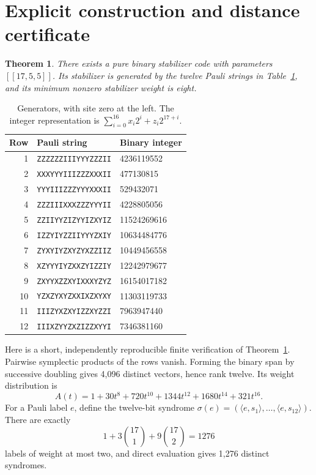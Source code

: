 \documentclass[11pt]{article}
\newtheorem{theorem}{Theorem}
\begin{document}
\section{Explicit construction and distance certificate}
\begin{theorem}\label{thm:code}
There exists a pure binary stabilizer code with parameters $[[17,5,5]]$. Its stabilizer is generated by the twelve Pauli strings in Table~\ref{tab:rows}, and its minimum nonzero stabilizer weight is eight.
\end{theorem}
\begin{table}[ht]
\centering
\begin{tabular}{rll}
\toprule
Row & Pauli string & Binary integer \\
\midrule
1 & \texttt{ZZZZZZIIIYYYZZZII} & 4236119552\\
2 & \texttt{XXXYYYIIIZZZXXXII} & 477130815\\
3 & \texttt{YYYIIIZZZYYYXXXII} & 529432071\\
4 & \texttt{ZZZIIIXXXZZZYYYII} & 4228805056\\
5 & \texttt{ZZIIYYZIZYYIZXYIZ} & 11524269616\\
6 & \texttt{IZZYIYZZIIYYYZXIY} & 10634484776\\
7 & \texttt{ZYXYIYZXYZYXZZIIZ} & 10449456558\\
8 & \texttt{XZYYYIYZXXZYIZZIY} & 12242979677\\
9 & \texttt{ZXYYXZZXYIXXXYZYZ} & 16154017182\\
10 & \texttt{YZXZYXYZXXIXZXYXY} & 11303119733\\
11 & \texttt{IIIZYXZXYIZZXYZZI} & 7963947440\\
12 & \texttt{IIIXZYYZXZIZZXYYI} & 7346381160\\
\bottomrule
\end{tabular}
\caption{Generators, with site zero at the left. The integer representation is $\sum_{i=0}^{16}x_i2^i+z_i2^{17+i}$.}\label{tab:rows}
\end{table}

Here is a short, independently reproducible finite verification of Theorem~\ref{thm:code}. Pairwise symplectic products of the rows vanish. Forming the binary span by successive doubling gives 4,096 distinct vectors, hence rank twelve. Its weight distribution is
\begin{equation}\label{eq:A}
 A(t)=1+30t^8+720t^{10}+1344t^{12}+1680t^{14}+321t^{16}.
\end{equation}
For a Pauli label $e$, define the twelve-bit syndrome
$\sigma(e)=(\langle e,s_1\rangle,\ldots,\langle e,s_{12}\rangle)$.
There are exactly
\[
 1+3\binom{17}{1}+9\binom{17}{2}=1276
\]
labels of weight at most two, and direct evaluation gives 1,276 distinct syndromes.
\end{document}
